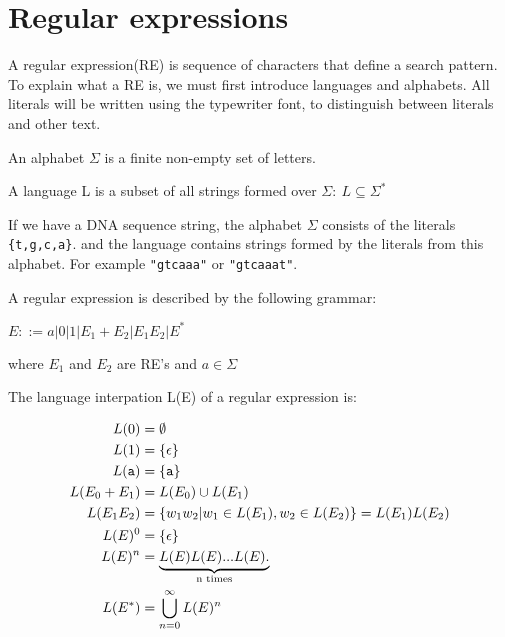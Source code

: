 \section{Regular expressions} 
A regular expression(RE) is sequence of characters that define a search pattern. To explain what a RE  is, we must first introduce languages and alphabets. All literals will be written using the typewriter font, to distinguish between literals and other text. 
\begin{mydef}\label{alph}
An alphabet $\Sigma$ is a finite non-empty set of letters.
\end{mydef}

\begin{mydef}\label{lang}
A language L is a subset of all strings formed over $\Sigma:~ L\subseteq \Sigma^*$
\end{mydef}

\begin{myex}\label{reex}
If we have a DNA sequence string, the alphabet $\Sigma$ consists of the literals {\tt\{t,g,c,a\}}. and the language contains strings formed by the literals from this alphabet. For example {\tt "gtcaaa"} or  {\tt "gtcaaat"}. 
\end{myex}


\begin{mydef}
A regular expression is described by the following grammar: \\
\begin{center}
$E::= a|0|1|E_1 + E_2 |E_1 E_2 | E^*$
\end{center}
where $E_1$ and $E_2$ are RE's and $a \in \Sigma$
\end{mydef}

\begin{mydef}\label{re}
The language interpation L(E) of a regular expression is: 
\begin{center}
\begin{align*}
L(0)           &= \emptyset\\
L(1)         &= \{\epsilon\} \\
L({\tt a})     &= \{{\tt a}\} \\
L(E_0 + E_1) &= L(E_0) \cup L(E_1) \\
L(E_1 E_2)   &= \{w_1w_2 | w_1 \in L(E_1),w_2 \in L(E_2)\}=L(E_1)L(E_2) \\
L(E)^0       &= \{\epsilon\}\\
L(E)^n       &= \underbrace{L(E)L(E)...L(E).}_\text{n times}\\
L(E^*)       &= \bigcup\limits_{n=0}^\infty L(E)^n 
\end{align*}
\end{center}
\cite[p.5 def. 3]{crash}
\end{mydef}

